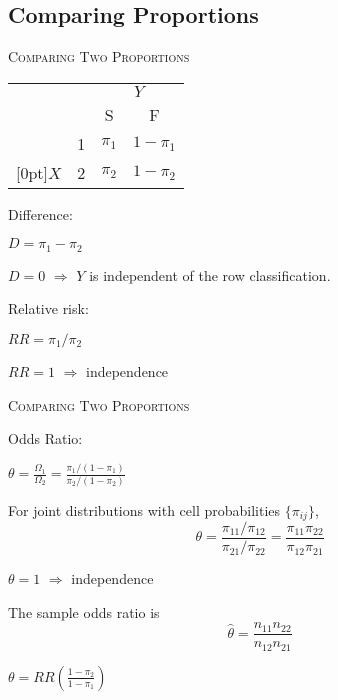 \documentclass[dvipdfmx, serif,handout]{beamer}
\begin{document}
\subsection{Comparing Proportions}
\begin{frame}{\textsc{Comparing Two Proportions}}

	\vspace{-.3cm}
	\begin{center}
		{\footnotesize
			\renewcommand{\arraystretch}{.8}
			\begin{tabular}{cccc|}                                                                                               \\
				                           &                        & \multicolumn{2}{c}{$Y$}                         \\
				                           &                        & S                       & \multicolumn{1}{c}{F} \\ \cline{3-4}
				                           & \multicolumn{1}{c|}{1} & $\pi_1$                 & $1-\pi_1$             \\
				\raisebox{1.5ex}[0pt]{$X$} & \multicolumn{1}{c|}{2} & $\pi_2$                 & $1-\pi_2$             \\ \cline{3-4}
			\end{tabular}
		}
	\end{center}
	\benu
	\item Difference:
	\bi
	\item $D=\pi_1-\pi_2$
	\item $D=0$ $\Rightarrow$ $Y$ is independent of the row classification.
	\ei
	\item Relative risk:
	\bi
	\item $RR = \pi_1/\pi_2$
	\item $RR=1$ $\Rightarrow$ independence
	\ei
	\eenu

\end{frame}
\begin{frame}{\textsc{Comparing Two Proportions}}

	\benu
	\item[3.] Odds Ratio:
	\bi
	\item $\theta = \frac{\Omega_1}{\Omega_2}=\frac{\pi_1/(1-\pi_1)}{\pi_2/(1-\pi_2)}$
	\item For joint distributions with cell probabilities $\{\pi_{ij}\}$,
	$$\theta=\frac{\pi_{11}/\pi_{12}}{\pi_{21}/\pi_{22}}=\frac{\pi_{11}\pi_{22}}{\pi_{12}\pi_{21}}$$
	\item $\theta=1$ $\Rightarrow$ independence
	\item The sample odds ratio is
	$$\hat{\theta} = \frac{n_{11}n_{22}}{n_{12}n_{21}}$$
	\item $\theta=RR \left(\frac{1-\pi_2}{1-\pi_1} \right)$
	\ei
	\eenu

\end{frame}
\end{document}
